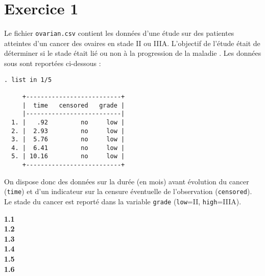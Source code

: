 \section*{Exercice 1}
Le fichier \texttt{ovarian.csv} contient les données d'une étude sur des
patientes atteintes d'un cancer des ovaires en stade II ou IIIA. L'objectif
de l'étude était de déterminer si le stade était lié ou non à la progression
de la maladie \cite[p.~389]{chow04}. Les données sous \Stata sont reportées
ci-dessous :
\begin{verbatim}
. list in 1/5

     +--------------------------+
     |  time   censored   grade |
     |--------------------------|
  1. |   .92         no     low |
  2. |  2.93         no     low |
  3. |  5.76         no     low |
  4. |  6.41         no     low |
  5. | 10.16         no     low |
     +--------------------------+
\end{verbatim}
On dispose donc des données sur la durée (en mois) avant évolution du cancer
(\texttt{time}) et d'un indicateur sur la censure éventuelle de
l'observation (\texttt{censored}). Le stade du cancer est reporté dans la
variable \texttt{grade} (\texttt{low}=II, \texttt{high}=IIIA).
\begin{description}
\item[\bf 1.1]  
\item[\bf 1.2]  
\item[\bf 1.3]  
\item[\bf 1.4]  
\item[\bf 1.5]  
\item[\bf 1.6]  
\end{description}

